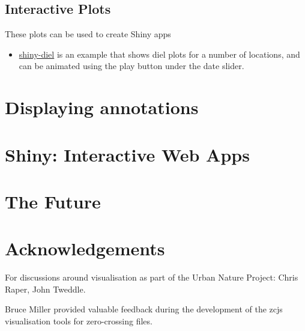 \documentclass[
]{book}
\providecommand{\tightlist}{%
  \setlength{\itemsep}{0pt}\setlength{\parskip}{0pt}}
\begin{document}
\hypertarget{interactive-plots}{%
\section{Interactive Plots}\label{interactive-plots}}

These plots can be used to create Shiny apps

\begin{itemize}
\tightlist
\item
  \href{https://shiny.ebaker.me.uk/shiny-diel/}{shiny-diel} is an example that shows diel plots for a number of locations, and can be animated using the play button under the date slider.
\end{itemize}

\hypertarget{displaying-annotations}{%
\chapter{Displaying annotations}\label{displaying-annotations}}

\hypertarget{shiny-interactive-web-apps}{%
\chapter{Shiny: Interactive Web Apps}\label{shiny-interactive-web-apps}}

\hypertarget{the-future}{%
\chapter{The Future}\label{the-future}}

\hypertarget{acknowledgements}{%
\chapter{Acknowledgements}\label{acknowledgements}}

For discussions around visualisation as part of the Urban Nature Project: Chris Raper, John Tweddle.

Bruce Miller provided valuable feedback during the development of the zcjs visualisation tools for zero-crossing files.

  
\end{document}
